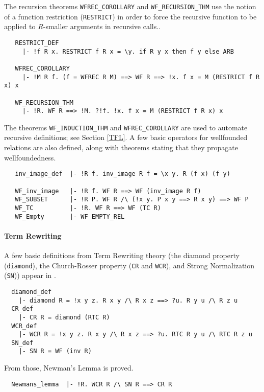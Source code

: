 The recursion theorems {\small\verb+WFREC_COROLLARY+} and
{\small\verb+WF_RECURSION_THM+} use the notion of a function
restriction ({\small\verb+RESTRICT+}) in order to force the recursive
function to be applied to $R$-smaller arguments in recursive calls..
%
\begin{hol}
{\small
\begin{verbatim}
   RESTRICT_DEF
     |- !f R x. RESTRICT f R x = \y. if R y x then f y else ARB

   WFREC_COROLLARY
     |- !M R f. (f = WFREC R M) ==> WF R ==> !x. f x = M (RESTRICT f R x) x

   WF_RECURSION_THM
     |- !R. WF R ==> !M. ?!f. !x. f x = M (RESTRICT f R x) x
\end{verbatim}
}
\end{hol}

\noindent The theorems {\small\verb+WF_INDUCTION_THM+} and
{\small\verb+WFREC_COROLLARY+} are used to automate recursive
definitions; see Section \ref{TFL}. A few basic operators for
wellfounded relations are also defined, along with theorems stating
that they propagate wellfoundedness.

\begin{hol}
\begin{verbatim}
   inv_image_def  |- !R f. inv_image R f = \x y. R (f x) (f y)

   WF_inv_image   |- !R f. WF R ==> WF (inv_image R f)
   WF_SUBSET      |- !R P. WF R /\ (!x y. P x y ==> R x y) ==> WF P
   WF_TC          |- !R. WF R ==> WF (TC R)
   WF_Empty       |- WF EMPTY_REL
\end{verbatim}
\end{hol}

\paragraph {Term Rewriting}

A few basic definitions from Term Rewriting theory
(the diamond property (\verb+diamond+), the Church-Rosser
property ({\small\verb+CR+} and {\small\verb+WCR+}), and Strong
Normalization ({\small\verb+SN+})) appear
in .
%
\begin{hol}
{\small
\begin{verbatim}
  diamond_def
    |- diamond R = !x y z. R x y /\ R x z ==> ?u. R y u /\ R z u
  CR_def
    |- CR R = diamond (RTC R)
  WCR_def
    |- WCR R = !x y z. R x y /\ R x z ==> ?u. RTC R y u /\ RTC R z u
  SN_def
    |- SN R = WF (inv R)
\end{verbatim}
}
\end{hol}
%
\noindent From those, Newman's Lemma is proved.
%
\begin{hol}
{\small
\begin{verbatim}
  Newmans_lemma  |- !R. WCR R /\ SN R ==> CR R
\end{verbatim}
}
\end{hol}

